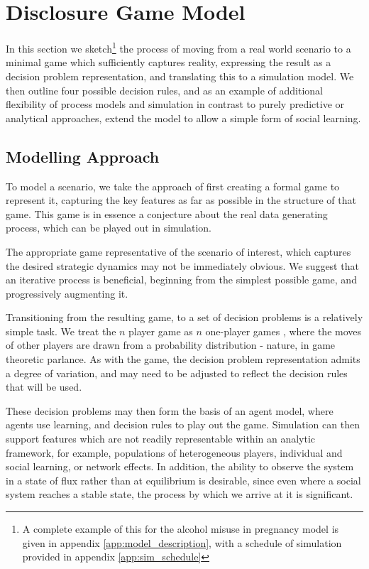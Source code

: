 \section{Disclosure Game Model}
\label{sec:midives_model}

In this section we sketch\footnote{A complete example of this for the alcohol misuse in pregnancy model is given in appendix \ref{app:model_description}, with a schedule of simulation provided in appendix \ref{app:sim_schedule}} the process of moving from a real world scenario to a minimal game which sufficiently captures reality, expressing the result as a decision problem representation, and translating this to a simulation model. We then outline four possible decision rules, and as an example of additional flexibility of process models and simulation in contrast to purely predictive or analytical approaches, extend the model to allow a simple form of social learning.


\subsection{Modelling Approach}
\label{sec:model_design}

To model a scenario, we take the approach of first creating a formal game to represent it, capturing the key features as far as possible in the structure of that game. This game is in essence a conjecture about the real data generating process, which can be played out in simulation.

The appropriate game representative of the scenario of interest, which captures the desired strategic dynamics may not be immediately obvious. We suggest that an iterative process is beneficial, beginning from the simplest possible game, and progressively augmenting it.

Transitioning from the resulting game, to a set of decision problems is a relatively simple task. We treat the $n$ player game as $n$ one-player games \citep{RiosInsua2009}, where the moves of other players are drawn from a probability distribution - nature, in game theoretic parlance. As with the game, the decision problem representation admits a degree of variation, and may need to be adjusted to reflect the decision rules that will be used.

These decision problems may then form the basis of an agent model, where agents use learning, and decision rules to play out the game. Simulation can then support features which are not readily representable within an analytic framework, for example, populations of heterogeneous players, individual and social learning, or network effects. In addition, the ability to observe the system in a state of flux rather than at equilibrium is desirable, since even where a social system reaches a stable state, the process by which we arrive at it is significant. 

